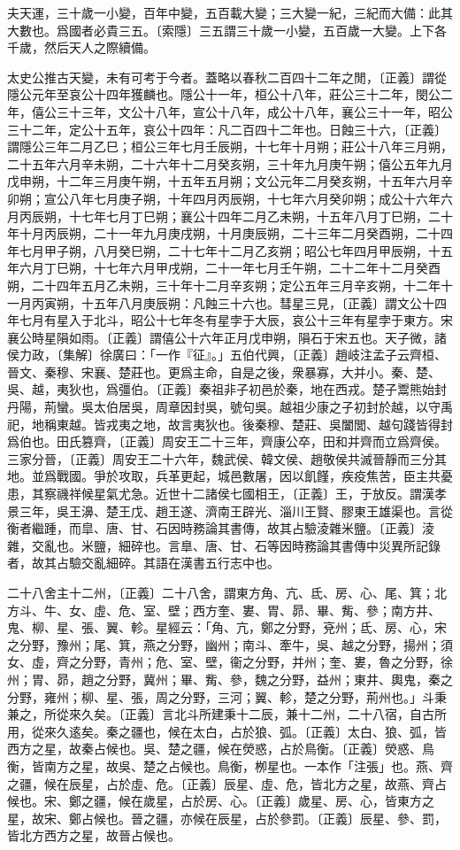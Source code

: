 夫天運，三十歲一小變，百年中變，五百載大變；三大變一紀，三紀而大備：此其大數也。爲國者必貴三五。〔索隱〕三五謂三十歲一小變，五百歲一大變。上下各千歲，然后天人之際續備。

太史公推古天變，未有可考于今者。蓋略以春秋二百四十二年之閒，〔正義〕謂從隱公元年至哀公十四年獲麟也。隱公十一年，桓公十八年，莊公三十二年，閔公二年，僖公三十三年，文公十八年，宣公十八年，成公十八年，襄公三十一年，昭公三十二年，定公十五年，哀公十四年：凡二百四十二年也。日蝕三十六，〔正義〕謂隱公三年二月乙巳；桓公三年七月壬辰朔，十七年十月朔；莊公十八年三月朔，二十五年六月辛未朔，二十六年十二月癸亥朔，三十年九月庚午朔；僖公五年九月戊申朔，十二年三月庚午朔，十五年五月朔；文公元年二月癸亥朔，十五年六月辛卯朔；宣公八年七月庚子朔，十年四月丙辰朔，十七年六月癸卯朔；成公十六年六月丙辰朔，十七年七月丁巳朔；襄公十四年二月乙未朔，十五年八月丁巳朔，二十年十月丙辰朔，二十一年九月庚戌朔，十月庚辰朔，二十三年二月癸酉朔，二十四年七月甲子朔，八月癸巳朔，二十七年十二月乙亥朔；昭公七年四月甲辰朔，十五年六月丁巳朔，十七年六月甲戌朔，二十一年七月壬午朔，二十二年十二月癸酉朔，二十四年五月乙未朔，三十年十二月辛亥朔；定公五年三月辛亥朔，十二年十一月丙寅朔，十五年八月庚辰朔：凡蝕三十六也。彗星三見，〔正義〕謂文公十四年七月有星入于北斗，昭公十七年冬有星孛于大辰，哀公十三年有星孛于東方。宋襄公時星隕如雨。〔正義〕謂僖公十六年正月戊申朔，隕石于宋五也。天子微，諸侯力政，〔集解〕徐廣曰：「一作『征』。」五伯代興，〔正義〕趙岐注孟子云齊桓、晉文、秦穆、宋襄、楚莊也。更爲主命，自是之後，衆暴寡，大并小。秦、楚、吳、越，夷狄也，爲彊伯。〔正義〕秦祖非子初邑於秦，地在西戎。楚子鬻熊始封丹陽，荊蠻。吳太伯居吳，周章因封吳，號句吳。越祖少康之子初封於越，以守禹祀，地稱東越。皆戎夷之地，故言夷狄也。後秦穆、楚莊、吳闔閭、越句踐皆得封爲伯也。田氏篡齊，〔正義〕周安王二十三年，齊康公卒，田和并齊而立爲齊侯。三家分晉，〔正義〕周安王二十六年，魏武侯、韓文侯、趙敬侯共滅晉靜而三分其地。並爲戰國。爭於攻取，兵革更起，城邑數屠，因以飢饉，疾疫焦苦，臣主共憂患，其察禨祥候星氣尤急。近世十二諸侯七國相王，〔正義〕王，于放反。謂漢孝景三年，吳王濞、楚王戊、趙王遂、濟南王辟光、淄川王賢、膠東王雄渠也。言從衡者繼踵，而皐、唐、甘、石因時務論其書傳，故其占驗淩雜米鹽。〔正義〕淩雜，交亂也。米鹽，細碎也。言臯、唐、甘、石等因時務論其書傳中災異所記錄者，故其占驗交亂細碎。其語在漢書五行志中也。

二十八舍主十二州，〔正義〕二十八舍，謂東方角、亢、氐、房、心、尾、箕；北方斗、牛、女、虛、危、室、壁；西方奎、婁、胃、昴、畢、觜、參；南方井、鬼、柳、星、張、翼、軫。星經云：「角、亢，鄭之分野，兗州；氐、房、心，宋之分野，豫州；尾、箕，燕之分野，幽州；南斗、牽牛，吳、越之分野，揚州；須女、虛，齊之分野，青州；危、室、壁，衞之分野，并州；奎、婁，魯之分野，徐州；胃、昴，趙之分野，冀州；畢、觜、參，魏之分野，益州；東井、輿鬼，秦之分野，雍州；柳、星、張，周之分野，三河；翼、軫，楚之分野，荊州也。」斗秉兼之，所從來久矣。〔正義〕言北斗所建秉十二辰，兼十二州，二十八宿，自古所用，從來久逺矣。秦之疆也，候在太白，占於狼、弧。〔正義〕太白、狼、弧，皆西方之星，故秦占候也。吳、楚之疆，候在熒惑，占於鳥衡。〔正義〕熒惑、鳥衡，皆南方之星，故吳、楚之占候也。鳥衡，栁星也。一本作「注張」也。燕、齊之疆，候在辰星，占於虛、危。〔正義〕辰星、虛、危，皆北方之星，故燕、齊占候也。宋、鄭之疆，候在歲星，占於房、心。〔正義〕歲星、房、心，皆東方之星，故宋、鄭占候也。晉之疆，亦候在辰星，占於參罰。〔正義〕辰星、參、罰，皆北方西方之星，故晉占候也。

